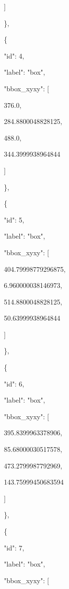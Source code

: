 \documentclass[10pt,a4paper]{article}
\begin{document}
      ]\par
    \},\allowbreak{}\par
    \{\par
      "id":\allowbreak{} 4,\allowbreak{}\par
      "label":\allowbreak{} "box",\allowbreak{}\par
      "bbox\_xyxy":\allowbreak{} [\par
        376.0,\allowbreak{}\par
        284.8800048828125,\allowbreak{}\par
        488.0,\allowbreak{}\par
        344.3999938964844\par
      ]\par
    \},\allowbreak{}\par
    \{\par
      "id":\allowbreak{} 5,\allowbreak{}\par
      "label":\allowbreak{} "box",\allowbreak{}\par
      "bbox\_xyxy":\allowbreak{} [\par
        404.79998779296875,\allowbreak{}\par
        6.960000038146973,\allowbreak{}\par
        514.8800048828125,\allowbreak{}\par
        50.63999938964844\par
      ]\par
    \},\allowbreak{}\par
    \{\par
      "id":\allowbreak{} 6,\allowbreak{}\par
      "label":\allowbreak{} "box",\allowbreak{}\par
      "bbox\_xyxy":\allowbreak{} [\par
        395.8399963378906,\allowbreak{}\par
        85.68000030517578,\allowbreak{}\par
        473.2799987792969,\allowbreak{}\par
        143.75999450683594\par
      ]\par
    \},\allowbreak{}\par
    \{\par
      "id":\allowbreak{} 7,\allowbreak{}\par
      "label":\allowbreak{} "box",\allowbreak{}\par
      "bbox\_xyxy":\allowbreak{} [\par
\end{document}
